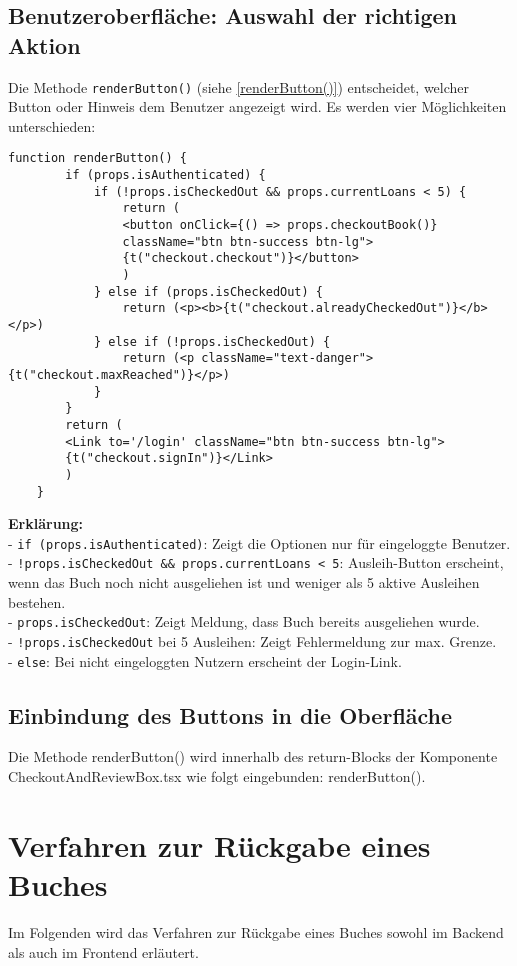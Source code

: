 \subsection*{Benutzeroberfläche: Auswahl der richtigen Aktion}

Die Methode \texttt{renderButton()} (siehe \ref{renderButton()}) entscheidet, welcher Button oder Hinweis dem Benutzer angezeigt wird. Es werden vier Möglichkeiten unterschieden:

\begin{lstlisting}[style=pseudocode, caption=renderButton() in CheckoutAndReviewBox.tsx, label=renderButton(), breaklines=true]
	function renderButton() {
		if (props.isAuthenticated) {
			if (!props.isCheckedOut && props.currentLoans < 5) {
				return (
				<button onClick={() => props.checkoutBook()}
				className="btn btn-success btn-lg">
				{t("checkout.checkout")}</button>
				)
			} else if (props.isCheckedOut) {
				return (<p><b>{t("checkout.alreadyCheckedOut")}</b></p>)
			} else if (!props.isCheckedOut) {
				return (<p className="text-danger">{t("checkout.maxReached")}</p>)
			}
		}
		return (
		<Link to='/login' className="btn btn-success btn-lg">
		{t("checkout.signIn")}</Link>
		)
	}
\end{lstlisting}

\noindent \textbf{Erklärung:} \\
- \texttt{if (props.isAuthenticated)}: Zeigt die Optionen nur für eingeloggte Benutzer.\\
- \texttt{!props.isCheckedOut \&\& props.currentLoans < 5}: Ausleih-Button erscheint, wenn das Buch noch nicht  ausgeliehen ist und weniger als 5 aktive Ausleihen bestehen.\\
- \texttt{props.isCheckedOut}: Zeigt Meldung, dass Buch bereits ausgeliehen wurde.\\
- \texttt{!props.isCheckedOut} bei 5 Ausleihen: Zeigt Fehlermeldung zur max. Grenze.\\
- \texttt{else}: Bei nicht eingeloggten Nutzern erscheint der Login-Link.

\subsection*{Einbindung des Buttons in die Oberfläche}

Die Methode renderButton() wird innerhalb des return-Blocks der Komponente CheckoutAndReviewBox.tsx wie folgt eingebunden: {renderButton()}.

\section{Verfahren zur Rückgabe eines Buches}
Im Folgenden wird das Verfahren zur Rückgabe eines Buches sowohl im Backend als auch im Frontend erläutert.

